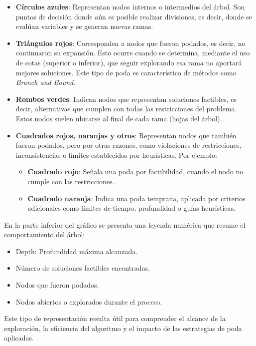 \begin{itemize}
    \item \textbf{ Círculos azules}: Representan nodos internos o intermedios del árbol. Son puntos de decisión donde aún es posible realizar divisiones, es decir, donde se evalúan variables y se generan nuevas ramas.

    \item \textbf{ Triángulos rojos}: Corresponden a nodos que fueron podados, es decir, no continuaron su expansión. Esto ocurre cuando se determina, mediante el uso de cotas (superior o inferior), que seguir explorando esa rama no aportará mejores soluciones. Este tipo de poda es característico de métodos como \textit{Branch and Bound}.

    \item \textbf{ Rombos verdes}: Indican nodos que representan soluciones factibles, es decir, alternativas que cumplen con todas las restricciones del problema. Estos nodos suelen ubicarse al final de cada rama (hojas del árbol).

    \item \textbf{ Cuadrados rojos, naranjas y otros}: Representan nodos que también fueron podados, pero por otras razones, como violaciones de restricciones, inconsistencias o límites establecidos por heurísticas. Por ejemplo:
    \begin{itemize}
        \item \textbf{Cuadrado rojo}: Señala una poda por factibilidad, cuando el nodo no cumple con las restricciones.
        \item \textbf{Cuadrado naranja}: Indica una poda temprana, aplicada por criterios adicionales como límites de tiempo, profundidad o guías heurísticas.
    \end{itemize}
\end{itemize}

En la parte inferior del gráfico se presenta una leyenda numérica que resume el comportamiento del árbol:

\begin{itemize}
    \item {Depth:} Profundidad máxima alcanzada.
    \item  Número de soluciones factibles encontradas.
    \item Nodos que fueron podados.
    \item Nodos abiertos o explorados durante el proceso.
\end{itemize}

Este tipo de representación resulta útil para comprender el alcance de la exploración, la eficiencia del algoritmo y el impacto de las estrategias de poda aplicadas.

